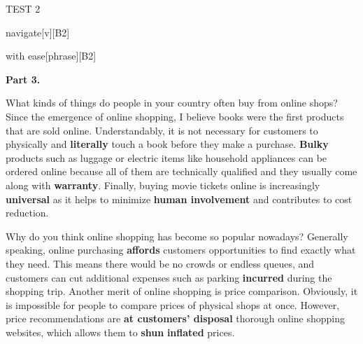 \begin{glossarymc}[Cambridge 15]
\begin{test}{TEST 2}
\begin{VocabExplain}[Part 2]
            \begin{ExplainCard}{navigate}[v][B2]
            \end{ExplainCard}

            \begin{ExplainCard}{with ease}[phrase][B2]
            \end{ExplainCard}
        \end{VocabExplain}

    \noindent
    \textbf{Part 3.}
    \begin{qa}{What kinds of things do people in your country often buy from online shops?}
    Since the emergence of online shopping, I believe books were the first products that are sold online. Understandably, it is not necessary for customers to physically and \textbf{literally} touch a book before they make a purchase. \textbf{Bulky} products such as luggage or electric items like household appliances can be ordered online because all of them are technically qualified and they usually come along with \textbf{warranty}. Finally, buying movie tickets online is increasingly \textbf{universal} as it helps to minimize \textbf{human involvement} and contributes to cost reduction.
    \end{qa}

    \begin{qa}{Why do you think online shopping has become so popular nowadays?}
    Generally speaking, online purchasing \textbf{affords} customers opportunities to find exactly what they need. This means there would be no crowds or endless queues, and customers can cut additional expenses such as parking \textbf{incurred} during the shopping trip. Another merit of online shopping is price comparison. Obviously, it is impossible for people to compare prices of physical shops at once. However, price recommendations are \textbf{at customers’ disposal} thorough online shopping websites, which allows them to \textbf{shun} \textbf{inflated} prices.
    \end{qa}


\end{test}
\end{glossarymc}
